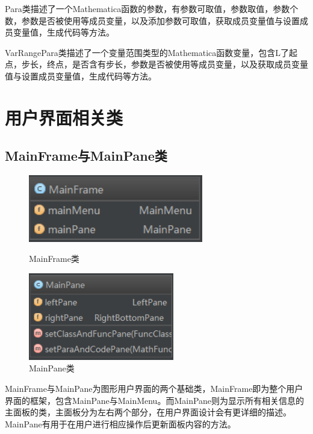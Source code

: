 \documentclass[hyperref, UTF8
,bookmarksnumbered=true, oneside]{ctexbook}
\begin{document}
			Para类描述了一个Mathematica函数的参数，有参数可取值，参数取值，参数个数，参数是否被使用等成员变量，以及添加参数可取值，获取成员变量值与设置成员变量值，生成代码等方法。

			VarRangePara类描述了一个变量范围类型的Mathematica函数变量，包含L了起点，步长，终点，是否含有步长，参数是否被使用等成员变量，以及获取成员变量值与设置成员变量值，生成代码等方法。


		
		

	\section{用户界面相关类} %


		\subsection{MainFrame与MainPane类} %
		\label{sub:mainframe}
			\begin{figure}[!h]
				\begin{minipage}[b]{0.45\textwidth}
				\centering
				\includegraphics[width=3in]{MainFrame.png}
				\caption{MainFrame类}
				\label{pic:MathPack}
				\end{minipage}%
				\hspace{0.1\textwidth}%
				\begin{minipage}[b]{0.45\textwidth}
				\centering
				\includegraphics[width=2.5in]{MainPane.png}
				\caption{MainPane类}
				\label{pic:GUIPack}
				\end{minipage}
			\end{figure}

		MainFrame与MainPane为图形用户界面的两个基础类，MainFrame即为整个用户界面的框架，包含MainPane与MainMenu。而MainPane则为显示所有相关信息的主面板的类，主面板分为左右两个部分，在用户界面设计会有更详细的描述。MainPane有用于在用户进行相应操作后更新面板内容的方法。
\end{document}
